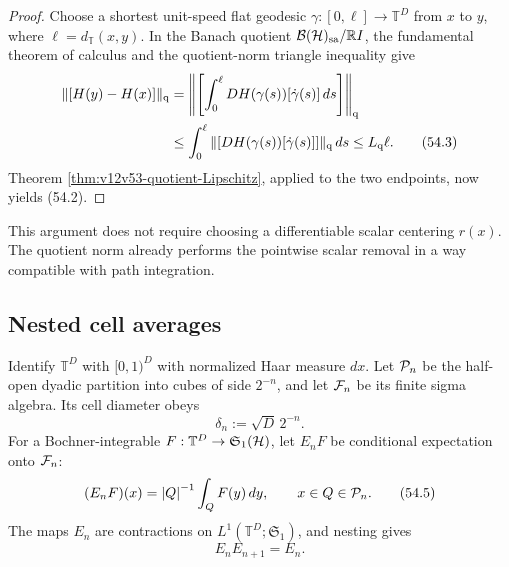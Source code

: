 \documentclass[11pt]{article}
\theoremstyle{remark}
\begin{document}
\begin{proof}
Choose a shortest unit-speed flat geodesic
\(\gamma:[0,\ell]\to{\mathbb T}^D\) from \(x\) to \(y\), where
\(\ell=d_{\mathbb T}(x,y)\).  In the Banach quotient
\({\cal B}({\cal H})_{\rm sa}/\mathbb RI\), the fundamental theorem
of calculus and the quotient-norm triangle inequality give
\begin{align}
 \|[H(y)-H(x)]\|_{\rm q}
 &=
 \left\|\left[
 \int_0^\ell DH(\gamma(s))[\dot\gamma(s)]\,ds
 \right]\right\|_{\rm q}                         \nonumber\\
 &\leq
 \int_0^\ell
 \|[DH(\gamma(s))[\dot\gamma(s)]]\|_{\rm q}\,ds
 \leq L_{\rm q}\ell.                              \tag{54.3}
\end{align}
Theorem \ref{thm:v12v53-quotient-Lipschitz}, applied to the two
endpoints, now yields (54.2).
\end{proof}

This argument does not require choosing a differentiable scalar
centering \(r(x)\).  The quotient norm already performs the
pointwise scalar removal in a way compatible with path integration.

\subsection{Nested cell averages}

Identify \({\mathbb T}^D\) with \([0,1)^D\) with normalized Haar
measure \(dx\).  Let \({\cal P}_n\) be the half-open dyadic partition
into cubes of side \(2^{-n}\), and let \({\cal F}_n\) be its finite
sigma algebra.  Its cell diameter obeys
\begin{equation}
                         \delta_n:=\sqrt D\,2^{-n}.           \tag{54.4}
\end{equation}
For a Bochner-integrable
\(F:{\mathbb T}^D\to{\mathfrak S}_1({\cal H})\), let
\(E_nF\) be conditional expectation onto \({\cal F}_n\):
\begin{equation}
 (E_nF)(x)
 =
 {|Q|}^{-1}\int_QF(y)\,dy,
 \qquad x\in Q\in{\cal P}_n.                     \tag{54.5}
\end{equation}
The maps \(E_n\) are contractions on
\(L^1({\mathbb T}^D;{\mathfrak S}_1)\), and nesting gives
\begin{equation}
                         E_nE_{n+1}=E_n.          \tag{54.6}
\end{equation}
\end{document}
